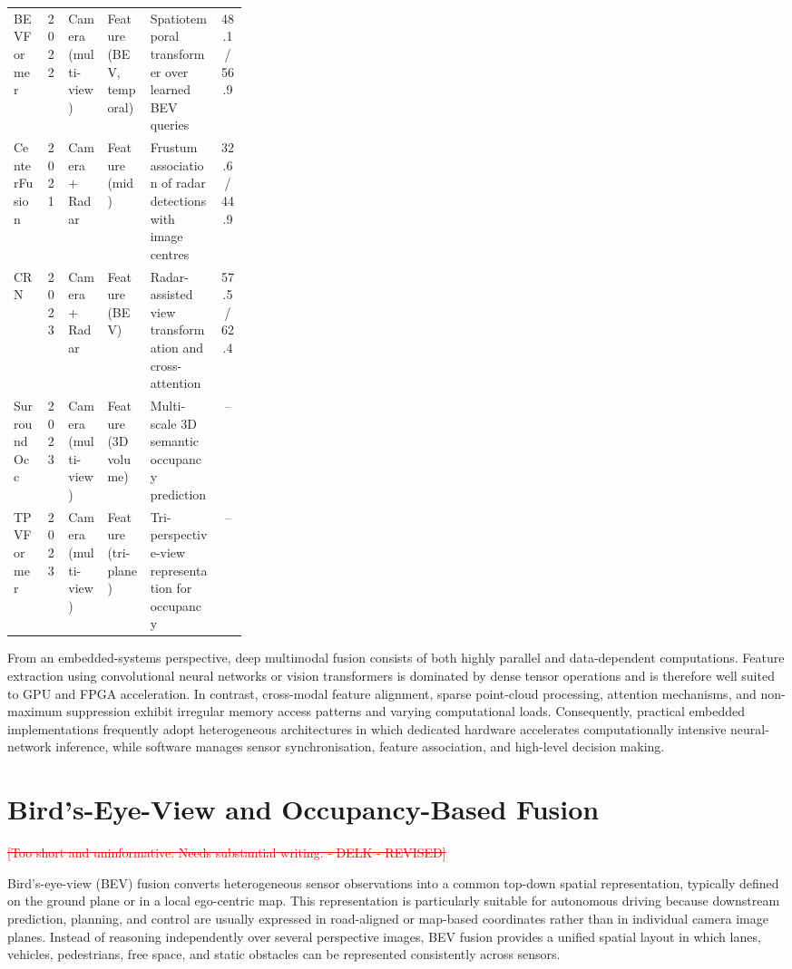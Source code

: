 \documentclass[11pt,oneside,openany]{book}
\newcommand{\deleted}[1]{\textcolor{red}{\sout{#1}}}
\begin{document}
\begin{table}[!t]
\begin{tabular}{l c l l p{0.30\linewidth} c}
        BEVFormer \cite{li2022_bevformer} & 2022 & Camera (multi-view) & Feature (BEV, temporal) & Spatiotemporal transformer over learned BEV queries & 48.1 / 56.9 \\
        CenterFusion \cite{nabati2021_centerfusion} & 2021 & Camera + Radar & Feature (mid) & Frustum association of radar detections with image centres & 32.6 / 44.9 \\
        CRN \cite{kim2023_crn} & 2023 & Camera + Radar & Feature (BEV) & Radar-assisted view transformation and cross-attention & 57.5 / 62.4 \\
        SurroundOcc \cite{wei2023_surroundocc} & 2023 & Camera (multi-view) & Feature (3D volume) & Multi-scale 3D semantic occupancy prediction & -- \\
        TPVFormer \cite{huang2023_tpvformer} & 2023 & Camera (multi-view) & Feature (tri-plane) & Tri-perspective-view representation for occupancy & -- \\
        \hline
    \end{tabular}
\end{table}

From an embedded-systems perspective, deep multimodal fusion consists of both highly parallel and data-dependent computations. Feature extraction using convolutional neural networks or vision transformers is dominated by dense tensor operations and is therefore well suited to GPU and FPGA acceleration. In contrast, cross-modal feature alignment, sparse point-cloud processing, attention mechanisms, and non-maximum suppression exhibit irregular memory access patterns and varying computational loads. Consequently, practical embedded implementations frequently adopt heterogeneous architectures in which dedicated hardware accelerates computationally intensive neural-network inference, while software manages sensor synchronisation, feature association, and high-level decision making.

\section{Bird's-Eye-View and Occupancy-Based Fusion}

\deleted{[Too short and uninformative. Needs substantial writing. - DELK - REVISED]}

Bird's-eye-view (BEV) fusion converts heterogeneous sensor observations into a common top-down spatial representation, typically defined on the ground plane or in a local ego-centric map. This representation is particularly suitable for autonomous driving because downstream prediction, planning, and control are usually expressed in road-aligned or map-based coordinates rather than in individual camera image planes. Instead of reasoning independently over several perspective images, BEV fusion provides a unified spatial layout in which lanes, vehicles, pedestrians, free space, and static obstacles can be represented consistently across sensors.
\end{document}
